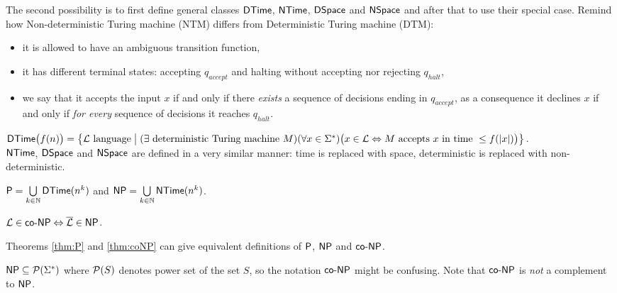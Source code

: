 		The second possibility is to first define general classes $\DTime$, $\NTime$, $\DSpace$ and $\NSpace$ and after that to use their special case. Remind how Non-deterministic Turing machine (NTM) differs from Deterministic Turing machine (DTM):
		\begin{itemize}
			\item it is allowed to have an ambiguous transition function,
			\item it has different terminal states: accepting $q_{accept}$ and halting without accepting nor rejecting $q_{halt}$,
			\item we say that it accepts the input $x$ if and only if there {\em exists} a sequence of decisions ending in $q_{accept}$, as a consequence it declines $x$ if and only if {\em for every} sequence of decisions it reaches $q_{halt}$.
		\end{itemize}
		
		\begin{defn}\label{def:DTime}
			$\DTime\bigl(f(n)\bigr) = \bigl\{ {\cal L}\textnormal{ language} \bigm| (\exists \textnormal{ deterministic Turing machine }M)\\ (\forall x\in\Sigma^*)\bigl(x\in{\cal L} \iff M\textnormal{ accepts }x\textnormal{ in time }\leq f(|x|)\bigr) \bigr\}$.\\
			$\NTime$, $\DSpace$ and $\NSpace$ are defined in a very similar manner: time is replaced with space, deterministic is replaced with non-deterministic.
		\end{defn}
		
		\begin{thm}
			\label{thm:P}
			$\P = \bigcup\limits_{k\in\N} \DTime(n^k)$ and $\NP = \bigcup\limits_{k\in\N} \NTime(n^k)$.
		\end{thm}
		
		\begin{thm}
			\label{thm:coNP}
			$ {\cal L} \in \coNP \iff {\cal\overline L} \in \NP $.
		\end{thm}
		
		\begin{note}
			Theorems \ref{thm:P} and \ref{thm:coNP} can give equivalent definitions of $\P$, $\NP$ and $\coNP$.
		\end{note}
		
		\begin{note}
			$\NP\subseteq\powerset{\Sigma^*}$ where $\powerset{S}$ denotes power set of the set $S$, so the notation $\coNP$ might be confusing. Note that $\coNP$ is {\em not} a complement to $\NP$.
		\end{note}
		
